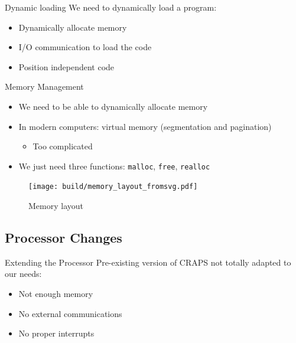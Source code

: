 \documentclass{beamer}
\begin{document}
      \begin{frame}{Dynamic loading}
        We need to dynamically load a program:
        \begin{itemize}
          \item Dynamically allocate memory
          \item I/O communication to load the code
          \item Position independent code
        \end{itemize}
      \end{frame}

      \begin{frame}{Memory Management}
        \begin{itemize}
          \item We need to be able to dynamically allocate memory
          \item In modern computers: virtual memory (segmentation and pagination)
            \begin{itemize}
              \item Too complicated
            \end{itemize}
          \item We just need three functions: \texttt{malloc}, \texttt{free},
            \texttt{realloc}
        \end{itemize}
      \end{frame}

      \begin{frame}[plain]
        \begin{figure}
          \begin{minipage}[c]{0.5\textwidth}
            \caption{Memory layout}
          \end{minipage}\hfill
          \begin{minipage}[c]{0.5\textwidth}
            \texttt{[image: build/memory\_layout\_fromsvg.pdf]}
          \end{minipage}
        \end{figure}
      \end{frame}

    \subsection{Processor Changes}

          \begin{frame}{Extending the Processor}
          Pre-existing version of CRAPS not totally adapted to our needs:
          \begin{itemize}
            \item Not enough memory
            \item No external communications
            \item No proper interrupts
          \end{itemize}
      \end{frame}
\end{document}
